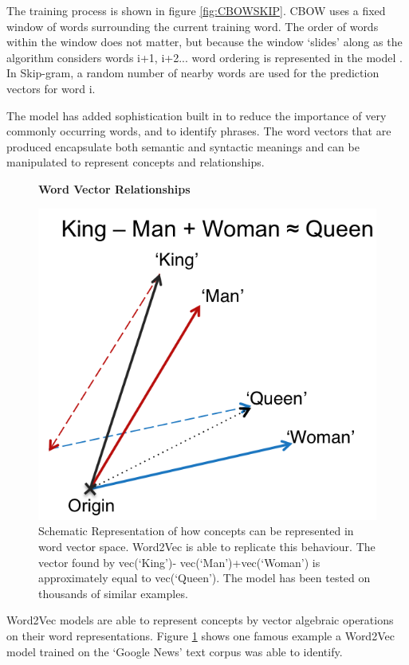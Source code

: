 The training process is shown in figure \ref{fig:CBOWSKIP}. CBOW uses a fixed window of words surrounding the current training word. The order of words within the window does not matter, but because the window `slides' along as the algorithm considers words i+1, i+2... word ordering is represented in the model . In Skip-gram, a random number of nearby words are used for the prediction vectors for word i. 

The model has added sophistication built in to reduce the importance of very commonly occurring words, and to identify phrases. The word vectors that are produced encapsulate both semantic and syntactic meanings and can be manipulated to represent concepts and relationships.
\begin{figure}[H]
    \centering
    \textbf{Word Vector Relationships}\par\medskip
    \includegraphics{Natural_Language_Processing/KINGQUEEN.png}
    \caption{Schematic Representation of how concepts can be represented in word vector space. Word2Vec is able to replicate this behaviour. The vector found by vec(‘King’)- vec(‘Man’)+vec(‘Woman’) is approximately equal to vec(‘Queen’). The model has been tested on thousands of similar examples\cite{word2vec2}\cite{word2veckingqueen}.}
     \label{fig:KINGQUEEN}
\end{figure}
Word2Vec models are able to represent concepts by vector algebraic operations on their word representations. Figure \ref{fig:KINGQUEEN} shows one famous example a Word2Vec model trained on the `Google News' text corpus was able to identify. 

